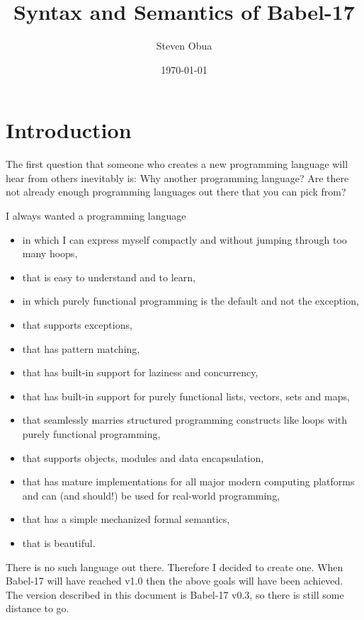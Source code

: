 \documentclass[11pt]{amsart}
\title{Syntax and Semantics of Babel-17}
\author{Steven Obua}
\date{\today}
\begin{document}


\maketitle

\tableofcontents

\section{Introduction}
The first question that someone who creates a new programming language will  hear from others inevitably is: Why another programming language? Are there not already enough programming languages out there that you can pick from?

I always wanted a programming language 
\begin{itemize}
\item in which I can express myself compactly and without jumping through too many hoops, 
\item that is easy to understand and to learn,
\item in which purely functional programming is the default and not the exception,
\item that supports exceptions,
\item that has pattern matching,
\item that has built-in support for laziness and concurrency,
\item that has built-in support for purely functional lists, vectors, sets and maps,
\item that seamlessly marries structured programming constructs like loops with purely functional programming,
\item that supports objects, modules and data encapsulation,
\item that has mature implementations for all major modern computing platforms and can (and should!) be used for real-world programming,
\item that has a simple mechanized formal semantics,
\item that is beautiful.
\end{itemize}
There is no such language out there. Therefore I decided to create one. When Babel-17 will have reached v1.0 then the above goals will have been achieved. The version described in this document is Babel-17 v0.3, so there is still some distance to go. 
\end{document}
